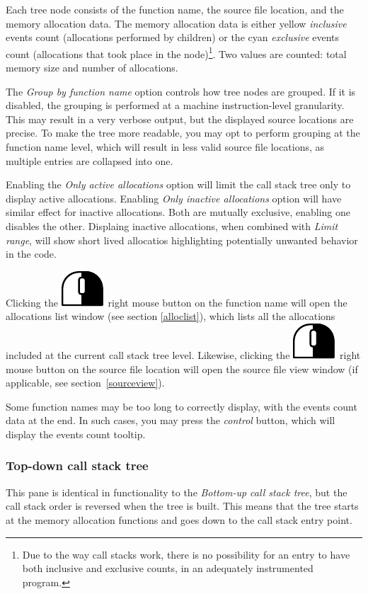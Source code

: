 \documentclass[hidelinks,titlepage,a4paper]{article}
\newcommand{\RMB}{\includegraphics[height=.8\baselineskip]{icons/rmb}}
\begin{document}
Each tree node consists of the function name, the source file location, and the memory allocation data. The memory allocation data is either yellow \emph{inclusive} events count (allocations performed by children) or the cyan \emph{exclusive} events count (allocations that took place in the node)\footnote{Due to the way call stacks work, there is no possibility for an entry to have both inclusive and exclusive counts, in an adequately instrumented program.}. Two values are counted: total memory size and number of allocations.

The \emph{Group by function name} option controls how tree nodes are grouped. If it is disabled, the grouping is performed at a machine instruction-level granularity. This may result in a very verbose output, but the displayed source locations are precise. To make the tree more readable, you may opt to perform grouping at the function name level, which will result in less valid source file locations, as multiple entries are collapsed into one.

Enabling the \emph{Only active allocations} option will limit the call stack tree only to display active allocations. Enabling \emph{Only inactive allocations} option will have similar effect for inactive allocations. Both are mutually exclusive, enabling one disables the other. Displaing inactive allocations, when combined with \emph{Limit range}, will show short lived allocatios highlighting potentially unwanted behavior in the code.

Clicking the \RMB{}~right mouse button on the function name will open the allocations list window (see section \ref{alloclist}), which lists all the allocations included at the current call stack tree level. Likewise, clicking the \RMB{}~right mouse button on the source file location will open the source file view window (if applicable, see section~\ref{sourceview}).

Some function names may be too long to correctly display, with the events count data at the end. In such cases, you may press the \emph{control} button, which will display the events count tooltip.

\subsubsection{Top-down call stack tree}

This pane is identical in functionality to the \emph{Bottom-up call stack tree}, but the call stack order is reversed when the tree is built. This means that the tree starts at the memory allocation functions and goes down to the call stack entry point.
\end{document}
